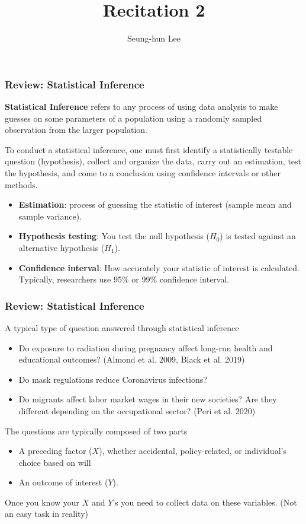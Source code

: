 \documentclass[compress]{beamer}
\title[Recitation 2]{Recitation 2} %
\author[Seung-hun Lee]{Seung-hun Lee}
\institute[Columbia University]{Columbia University}
\date[]{}
\newenvironment{wideitemize}{\itemize\addtolength{\itemsep}{10pt}}{\enditemize}
\begin{document}
\begin{frame}
\titlepage
\end{frame}




\begin{frame}
\frametitle{Review: Statistical Inference}
\begin{wideitemize}
\item\textbf{Statistical Inference} refers to any process of using data analysis to make guesses on some parameters of a population using a randomly sampled observation from the larger population. 
\item To conduct a statistical inference, one must first identify a statistically testable question (hypothesis), collect and organize the data, carry out an estimation, test the hypothesis, and come to a conclusion using confidence intervals or other methods.
\begin{itemize}
\item \textbf{Estimation}: process of guessing the statistic of interest (sample mean and sample variance). 
\item \textbf{Hypothesis testing}: You test the null hypothesis ($H_0$) is tested against an alternative hypothesis ($H_1$).  
\item \textbf{Confidence interval}: How accurately your statistic of interest is calculated. Typically, researchers use 95\% or 99\% confidence interval.
\end{itemize}
\end{wideitemize}
\end{frame}

\begin{frame}
\frametitle{Review: Statistical Inference}
\begin{wideitemize}
\item A typical type of question answered through statistical inference
\begin{itemize}
\item Do exposure to radiation during pregnancy affect long-run health and educational outcomes? (Almond et al. 2009, Black et al. 2019) 
\item Do mask regulations reduce Coronavirus infections?
\item Do migrants affect labor market wages in their new societies? Are they different depending on the occupational sector? (Peri et al. 2020)
\end{itemize}
\item The questions are typically composed of two parts
\begin{itemize}
\item A preceding factor ($X$), whether accidental, policy-related, or individual's choice based on will
\item An outcome of interest ($Y$). 
\end{itemize}
\item Once you know your $X$ and $Y$'s you need to collect data on these variables. (Not an easy task in reality)
\end{wideitemize}
\end{frame}
\end{document}
